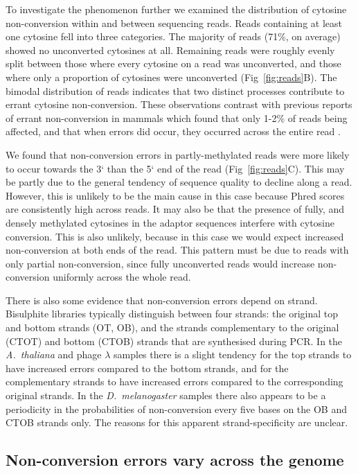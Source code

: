 \documentclass[10pt,draft,letterpaper]{article}
\begin{document}
To investigate the phenomenon further we examined the distribution of cytosine non-conversion within and between sequencing reads.
Reads containing at least one cytosine fell into three categories.
The majority of reads (71\%, on average) showed no unconverted cytosines at all.
Remaining reads were roughly evenly split between those where every cytosine on a read was unconverted, and those where only a proportion of cytosines were unconverted (Fig~\ref{fig:reads}B).
The bimodal distribution of reads indicates that two distinct processes contribute to errant cytosine non-conversion.
These observations contrast with previous reports of errant non-conversion in mammals which found that only 1-2\% of reads being affected, and that when errors did occur, they occurred across the entire read \cite{lu2015improved, suzuki2018whole}.

We found that non-conversion errors in partly-methylated reads were more likely to occur towards the 3` than the 5` end of the read (Fig~\ref{fig:reads}C).
This may be partly due to the general tendency of sequence quality to decline along a read.
However, this is unlikely to be the main cause in this case because Phred scores are consistently high across reads.
It may also be that the presence of fully, and densely methylated cytosines in the adaptor sequences interfere with cytosine conversion.
This is also unlikely, because in this case we would expect increased non-conversion at both ends of the read.
This pattern must be due to reads with only partial non-conversion, since fully unconverted reads would increase non-conversion uniformly across the whole read.

There is also some evidence that non-conversion errors depend on strand.
Bisulphite libraries typically distinguish between four strands: the original top and bottom strands (OT, OB), and the strands complementary to the original (CTOT) and bottom (CTOB) strands that are synthesised during PCR.
In the \emph{A.~thaliana} and phage $\lambda$ samples there is a slight tendency for the top strands to have increased errors compared to the bottom strands, and for the complementary strands to have increased errors compared to the corresponding original strands.
In the \emph{D.~melanogaster} samples there also appears to be a periodicity in the probabilities of non-conversion every five bases on the OB and CTOB strands only.
The reasons for this apparent strand-specificity are unclear.

\subsection*{Non-conversion errors vary across the genome}
\end{document}
